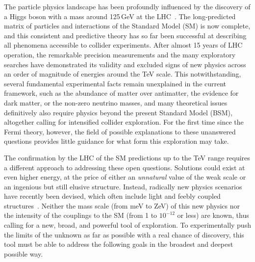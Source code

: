 The particle physics landscape has been profoundly influenced by the discovery of a Higgs boson with a mass around 125\,GeV at the LHC~\cite{CMS:2012qbp,ATLAS:2012yve}.
The long-predicted matrix of particles and interactions of the Standard Model (SM) is now complete, and this consistent and predictive theory has so far been successful at  describing all phenomena accessible to collider experiments.
After almost 15 years of LHC operation, the remarkable precision measurements and the many exploratory searches have demonstrated its validity and excluded signs of new physics across an order of magnitude of energies around the TeV scale.
This notwithstanding, several fundamental experimental facts remain unexplained in the current framework, such as the abundance of matter over antimatter, the evidence for dark matter, or the non-zero neutrino masses, and many theoretical issues definitively also require physics beyond the present Standard Model (BSM), altogether calling for intensified collider exploration. For the first time since the Fermi theory, however, the field of possible explanations to these unanswered questions provides little guidance for what form this exploration may take.

The confirmation by the LHC of the SM predictions up to the TeV range requires a different approach to addressing these open questions. 
Solutions could exist at even higher energy, at the price of either an \emph{unnatural} value of the weak scale or an ingenious but still elusive structure. 
Instead, radically new physics scenarios have recently been devised, which  often include light and feebly coupled structures~\cite{Graham:2015cka, Espinosa:2015eda, Arkani-Hamed:2020yna}.
Neither the mass scale (from meV to ZeV) of this new physics nor the intensity of the couplings to the SM (from 1 to $10^{-12}$ or less) are known, thus calling for a new, broad, and powerful tool of exploration. 
To experimentally push the limits of the unknown as far as possible with a real chance of discovery, this tool must be able to address the following goals in the broadest and deepest possible way.

